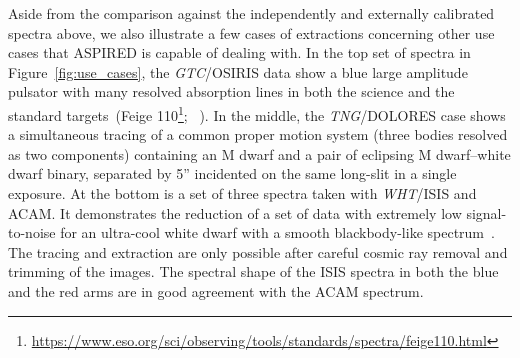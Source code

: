\documentclass[linenumbers, twocolumn]{aastex631}
\begin{document}
Aside from the comparison against the independently and externally calibrated
spectra above, we also illustrate a few cases of extractions concerning
other use cases that \textsc{ASPIRED} is capable of dealing with. In the top set
of spectra in Figure~\ref{fig:use_cases}, the \textit{GTC}/OSIRIS data show a
blue large amplitude pulsator with many resolved absorption lines in both the
science and the standard targets~(Feige 110\footnote{
\url{https://www.eso.org/sci/observing/tools/standards/spectra/feige110.html}};
~\citealp{2022MNRAS.511.4971M}). In the middle, the \textit{TNG}/DOLORES case
shows a simultaneous tracing of a common proper motion system (three bodies
resolved as two components) containing an M dwarf and a pair of eclipsing
M dwarf--white dwarf binary, separated by 5'' incidented on the same long-slit
in a single exposure. At the bottom is a set of three spectra taken
with \textit{WHT}/ISIS and ACAM. It demonstrates the reduction of a set of data with
extremely low signal-to-noise for an ultra-cool white dwarf with a smooth
blackbody-like spectrum~\citep{2020MNRAS.493.6001L}. The tracing and extraction
are only possible after careful cosmic ray removal and trimming of the images.
The spectral shape of the ISIS spectra in both the blue and the red arms are in
good agreement with the ACAM spectrum.
\end{document}

